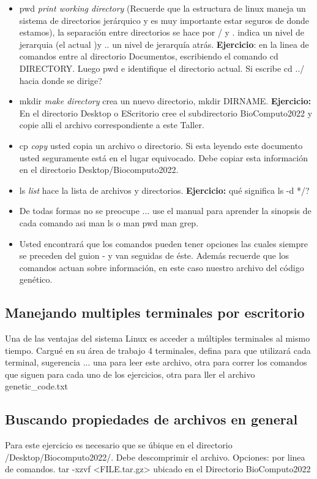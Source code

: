 \documentclass[10pt]{article}
\begin{document}
\begin{itemize}
\item pwd \textit{print working directory} (Recuerde que la estructura de linux maneja un sistema de directorios jerárquico y es muy importante estar seguros de donde estamos), la separación entre directorios se hace por / y . indica un nivel de jerarquia (el actual )y .. un nivel de jerarquía atrás.  \textbf{Ejercicio}: en la linea de comandos entre al directorio Documentos, escribiendo el comando cd DIRECTORY. Luego pwd e identifique el directorio actual. Si escribe cd ../ hacia donde se dirige?
\item mkdir \textit{make directory} crea un nuevo directorio, mkdir DIRNAME. \textbf{Ejercicio:} En el directorio Desktop o EScritorio cree el subdirectorio BioComputo2022 y copie alli el archivo correspondiente a este Taller.
\item cp \textit{copy} usted copia un archivo o directorio. Si esta leyendo este documento usted seguramente está en el lugar equivocado. Debe copiar esta información en el directorio Desktop/Biocomputo2022.
\item ls \textit{list} hace la lista de archivos y directorios. \textbf{Ejercicio:} qué significa ls -d */?
\item De todas formas no se preocupe ... use el manual para aprender la sinopsis de cada comando asi man ls o man pwd man grep.
\item Usted encontrará que los comandos pueden tener opciones las cuales siempre se preceden del guion - y van seguidas de éste. Además recuerde que los comandos actuan sobre información, en este caso nuestro archivo del código genético.
\end{itemize} 
   
\subsection{Manejando multiples terminales por escritorio}
Una de las ventajas del sistema Linux es acceder a múltiples terminales al mismo tiempo. Cargué en su área de trabajo 4 terminales, defina para que utilizará cada terminal, sugerencia ... una para leer este archivo, otra para correr los comandos que siguen para cada uno de los ejercicios, otra para ller el archivo genetic\_code.txt 

\subsection{Buscando propiedades de archivos en general}
Para este ejercicio es necesario que se úbique en el directorio /Desktop/Biocomputo2022/. Debe descomprimir el archivo. Opciones: por linea de comandos. tar -xzvf <FILE.tar.gz> ubicado en el Directorio BioComputo2022 
\end{document}
